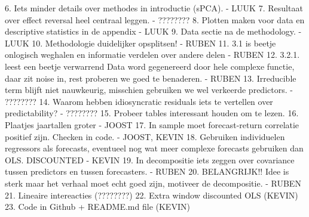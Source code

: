 \documentclass[a4paper,11pt]{article}
\begin{document}
6. Iets minder details over methodes in introductie (sPCA). - LUUK
7. Resultaat over effect reversal heel centraal leggen. - ????????
8. Plotten maken voor data en descriptive statistics in de appendix - LUUK
9. Data sectie na de methodology. - LUUK
10. Methodologie duidelijker opsplitsen! - RUBEN
11. 3.1 is beetje onlogisch weghalen en informatie verdelen over andere delen - RUBEN
12. 3.2.1. leest een beetje verwarrend Data word gegenereerd door hele complexe functie, daar zit noise in, rest proberen we goed te benaderen. - RUBEN
13. Irreducible term blijft niet nauwkeurig, misschien gebruiken we wel verkeerde predictors. - ????????
14. Waarom hebben idiosyncratic residuals iets te vertellen over predictability? - ????????
15. Probeer tables interessant houden om te lezen.
16. Plaatjes jaartallen groter - JOOST
17. In sample moet forecast-return correlatie positief zijn. Checken in code. - JOOST, KEVIN
18. Gebruiken individuelen regressors als forecasts, eventueel nog wat meer complexe forecasts gebruiken dan OLS. DISCOUNTED - KEVIN
19. In decompositie iets zeggen over covariance tussen predictors en tussen forecasters. - RUBEN
20. BELANGRIJK!! Idee is sterk maar het verhaal moet echt goed zijn, motiveer de decompositie. - RUBEN
21. Lineaire intereacties (????????)
22. Extra window discounted OLS (KEVIN)
23. Code in Github + README.md file (KEVIN)
\end{document}
